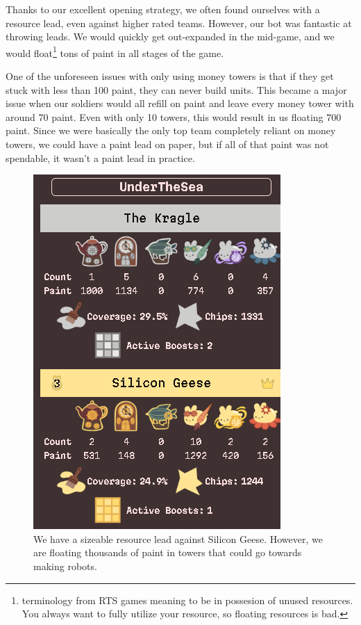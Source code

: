
Thanks to our excellent opening strategy, we often found ourselves with a resource lead, even against higher rated teams. However, our bot was fantastic at throwing leads. We would quickly get out-expanded in the mid-game, and we would float\footnote{terminology from RTS games meaning to be in possesion of unused resources. You always want to fully utilize your resource, so floating resources is bad.} tons of paint in all stages of the game.

\medskip

One of the unforeseen issues with only using money towers is that if they get stuck with less than 100 paint, they can never build units. This became a major issue when our soldiers would all refill on paint and leave every money tower with around 70 paint. Even with only 10 towers, this would result in us floating 700 paint. Since we were basically the only top team completely reliant on money towers, we could have a paint lead on paper, but if all of that paint was not spendable, it wasn't a paint lead in practice.

\begin{figure}[h]
    \centering
    \includegraphics[scale=0.5]{images/floating_resources.png}
    \caption{We have a sizeable resource lead against Silicon Geese. However, we are floating thousands of paint in towers that could go towards making robots.}
\end{figure}

